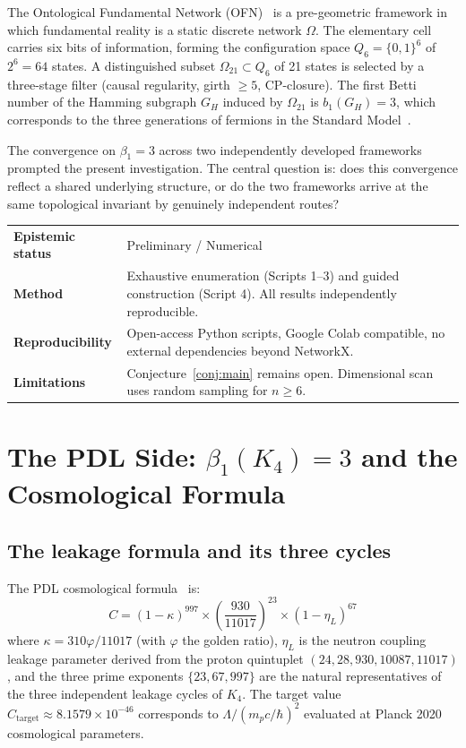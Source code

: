 \documentclass[11pt,a4paper]{article}
\newcommand{\epistemic}[4]{%
\begin{center}
\small
\begin{tabular}{>{\bfseries}p{3cm} p{10cm}}
\toprule
Epistemic status & #1 \\
Method           & #2 \\
Reproducibility  & #3 \\
Limitations      & #4 \\
\bottomrule
\end{tabular}
\end{center}
}
\begin{document}
The Ontological Fundamental Network (OFN)~\cite{Evdokimov_OFN_2026, Evdokimov_CWS_2026} is a pre-geometric framework in which fundamental reality is a static discrete network $\Omega$. The elementary cell carries six bits of information, forming the configuration space $Q_6 = \{0,1\}^6$ of $2^6 = 64$ states. A distinguished subset $\Omega_{21} \subset Q_6$ of 21 states is selected by a three-stage filter (causal regularity, girth $\geq 5$, CP-closure). The first Betti number of the Hamming subgraph $G_H$ induced by $\Omega_{21}$ is $b_1(G_H) = 3$, which corresponds to the three generations of fermions in the Standard Model~\cite{Evdokimov_CWS_2026}.

The convergence on $\beta_1 = 3$ across two independently developed frameworks prompted the present investigation. The central question is: does this convergence reflect a shared underlying structure, or do the two frameworks arrive at the same topological invariant by genuinely independent routes?

\epistemic{Preliminary / Numerical}{Exhaustive enumeration (Scripts 1--3) and guided construction (Script 4). All results independently reproducible.}{Open-access Python scripts, Google Colab compatible, no external dependencies beyond NetworkX.}{Conjecture~\ref{conj:main} remains open. Dimensional scan uses random sampling for $n \geq 6$.}

\section{The PDL Side: \texorpdfstring{$\beta_1(K_4) = 3$}{beta1(K4)=3} and the Cosmological Formula}
\label{sec:pdl}

\subsection{The leakage formula and its three cycles}

The PDL cosmological formula~\cite{Laubscher_D51_2026, Laubscher_D52_2026, Laubscher_D53_2026} is:
\begin{equation}
C = (1-\kappa)^{997} \times \left(\frac{930}{11017}\right)^{23} \times (1-\eta_L)^{67}
\label{eq:C}
\end{equation}
where $\kappa = 310\varphi/11017$ (with $\varphi$ the golden ratio), $\eta_L$ is the neutron coupling leakage parameter derived from the proton quintuplet $(24, 28, 930, 10087, 11017)$, and the three prime exponents $\{23, 67, 997\}$ are the natural representatives of the three independent leakage cycles of $K_4$. The target value $C_{\mathrm{target}} \approx 8.1579 \times 10^{-46}$ corresponds to $\Lambda / (m_p c/\hbar)^2$ evaluated at Planck 2020 cosmological parameters.
\end{document}
